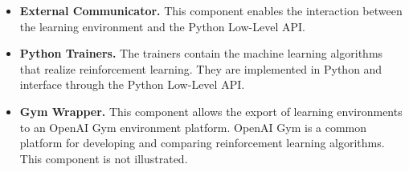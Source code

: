 \begin{itemize}
    \item \textbf{External Communicator.} This component enables the interaction between the learning environment and the Python Low-Level API.
    \item \textbf{Python Trainers.} The trainers contain the machine learning algorithms that realize reinforcement learning. They are implemented in Python and interface through the Python Low-Level API.
    \item \textbf{Gym Wrapper.} This component allows the export of learning environments to an OpenAI Gym \cite{github-openai-gym} environment platform. OpenAI Gym is a common platform for developing and comparing reinforcement learning algorithms. 
    This component is not illustrated. 

\end{itemize}


